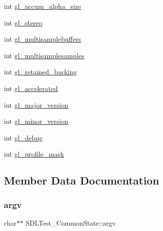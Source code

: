 \begin{DoxyCompactItemize}
\item 
int \mbox{\hyperlink{struct_s_d_l_test___common_state_ab6dddf75a40c53343199fe724a2af32b}{gl\+\_\+accum\+\_\+alpha\+\_\+size}}
\item 
int \mbox{\hyperlink{struct_s_d_l_test___common_state_a39177b165c6a9c2164937c82402e2d4f}{gl\+\_\+stereo}}
\item 
int \mbox{\hyperlink{struct_s_d_l_test___common_state_a083f7381809b23f0ac3a9a8de562f70c}{gl\+\_\+multisamplebuffers}}
\item 
int \mbox{\hyperlink{struct_s_d_l_test___common_state_a96718b47862d4962e4a7ae9a62ce4a30}{gl\+\_\+multisamplesamples}}
\item 
int \mbox{\hyperlink{struct_s_d_l_test___common_state_a5fa59e7aa6210fcde02940536eea9c12}{gl\+\_\+retained\+\_\+backing}}
\item 
int \mbox{\hyperlink{struct_s_d_l_test___common_state_a2dca523be403a9ff6fe2dd7b1808baba}{gl\+\_\+accelerated}}
\item 
int \mbox{\hyperlink{struct_s_d_l_test___common_state_a766e471516e0a39d0bb8c14ea2042bdf}{gl\+\_\+major\+\_\+version}}
\item 
int \mbox{\hyperlink{struct_s_d_l_test___common_state_a5a50c65004454c791da21a3473388608}{gl\+\_\+minor\+\_\+version}}
\item 
int \mbox{\hyperlink{struct_s_d_l_test___common_state_a2710657ef2a0c8aabebc5fceb01c71b5}{gl\+\_\+debug}}
\item 
int \mbox{\hyperlink{struct_s_d_l_test___common_state_aa923ff5f227c35523a4e491863a7d907}{gl\+\_\+profile\+\_\+mask}}
\end{DoxyCompactItemize}


\subsection{Member Data Documentation}
\mbox{\label{struct_s_d_l_test___common_state_a6db840410b86ab7c6807763fd8bcb081}} 
\subsubsection{\texorpdfstring{argv}{argv}}
{\footnotesize\ttfamily char$\ast$$\ast$ S\+D\+L\+Test\+\_\+\+Common\+State\+::argv}

